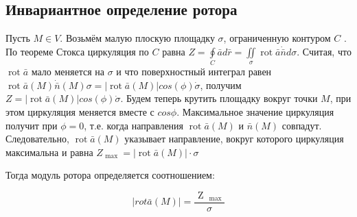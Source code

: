 \subsection{Инвариантное определение ротора}

Пусть $M \in V$. Возьмём малую плоскую площадку $\sigma$, ограниченную контуром  $C$ .
 По теореме Стокса циркуляция по $C$ равна $Z = \oint \limits_C \bar a d\bar r = \iint\limits _{\sigma}\operatorname{rot} \bar a\dot \bar n d\sigma$. 
Считая, что $\operatorname{rot} \bar a$ мало меняется на $\sigma$ и что поверхностный интеграл равен $\operatorname{rot} \bar a(M)\dot \bar n(M)\sigma = |\operatorname{rot} \bar a(M)|cos(\phi)\dot \sigma$, 
получим $Z=|\operatorname{rot} \bar a(M)|cos(\phi)\dot\sigma$.
Будем теперь крутить площадку вокруг точки  $M$, при этом циркуляция меняется вместе с $cos\phi$. Максимальное значение циркуляция получит при $\phi=0$, т.е. когда направления $\operatorname{rot} \bar a(M)$ и $\bar n(M)$ совпадут. Следовательно, $\operatorname{rot} \bar a(M)$ указывает направление, вокруг которого циркуляция максимальна и равна $Z_{\mbox { max } } =|\operatorname{rot} \bar a(M)| \cdot \sigma$

Тогда модуль ротора определяется соотношением:

$$| rot\bar { a } (M)| =\frac { \mbox { Z } _ { \mbox { max } } } { \sigma } $$

